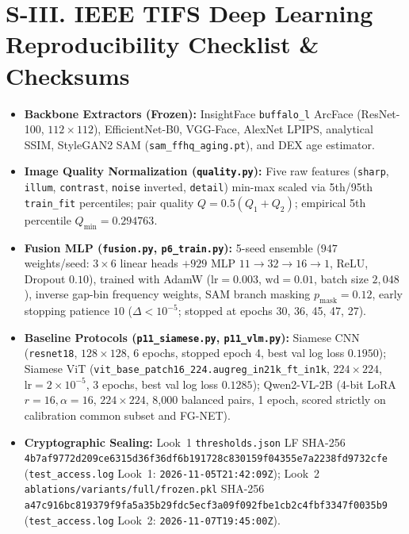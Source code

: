 \documentclass[journal]{IEEEtran}
\begin{document}
\section*{S-III. IEEE TIFS Deep Learning Reproducibility Checklist \& Checksums}
{\sloppy
\begin{itemize}
    \item \textbf{Backbone Extractors (Frozen):} InsightFace \texttt{buffalo\_l} ArcFace (ResNet-100, $112\times 112$), EfficientNet-B0, VGG-Face, AlexNet LPIPS, analytical SSIM, StyleGAN2 SAM (\texttt{sam\_ffhq\_aging.pt}), and DEX age estimator.
    \item \textbf{Image Quality Normalization (\texttt{quality.py}):} Five raw features (\texttt{sharp}, \texttt{illum}, \texttt{contrast}, \texttt{noise} inverted, \texttt{detail}) min-max scaled via 5th/95th \texttt{train\_fit} percentiles; pair quality $Q = 0.5(Q_1 + Q_2)$; empirical 5th percentile $Q_{\min} = 0.294763$.
    \item \textbf{Fusion MLP (\texttt{fusion.py}, \texttt{p6\_train.py}):} 5-seed ensemble ($947$ weights/seed: $3\times 6$ linear heads $+ 929$ MLP $11\to 32\to 16\to 1$, ReLU, Dropout $0.10$), trained with AdamW ($\text{lr}=0.003$, $\text{wd}=0.01$, batch size $2{,}048$), inverse gap-bin frequency weights, SAM branch masking $p_{\text{mask}}=0.12$, early stopping patience $10$ ($\Delta < 10^{-5}$; stopped at epochs 30, 36, 45, 47, 27).
    \item \textbf{Baseline Protocols (\texttt{p11\_siamese.py}, \texttt{p11\_vlm.py}):} Siamese CNN (\texttt{resnet18}, $128\times 128$, 6 epochs, stopped epoch 4, best val log loss $0.1950$); Siamese ViT (\texttt{vit\_base\_patch16\_224.augreg\_in21k\_ft\_in1k}, $224\times 224$, $\text{lr}=2\times 10^{-5}$, 3 epochs, best val log loss $0.1285$); Qwen2-VL-2B (4-bit LoRA $r=16, \alpha=16$, $224\times 224$, 8,000 balanced pairs, 1 epoch, scored strictly on calibration common subset and FG-NET).
    \item \textbf{Cryptographic Sealing:} Look~1 \texttt{thresholds.json} LF SHA-256 \texttt{4b7af9772d209ce6315d36f36df6b191\allowbreak 728c830159f04355e7a2238fd9732cfe} (\texttt{test\_access.log} Look~1: \texttt{2026-11-05T21:42:09Z}); Look~2 \texttt{ablations/variants/full/frozen.pkl} SHA-256 \texttt{a47c916bc819379f9fa5a35b29fdc5ec\allowbreak f3a09f092fbe1cb2c4fbf3347f0035b9} (\texttt{test\_access.log} Look~2: \texttt{2026-11-07T19:45:00Z}).
\end{itemize}
}
\end{document}
